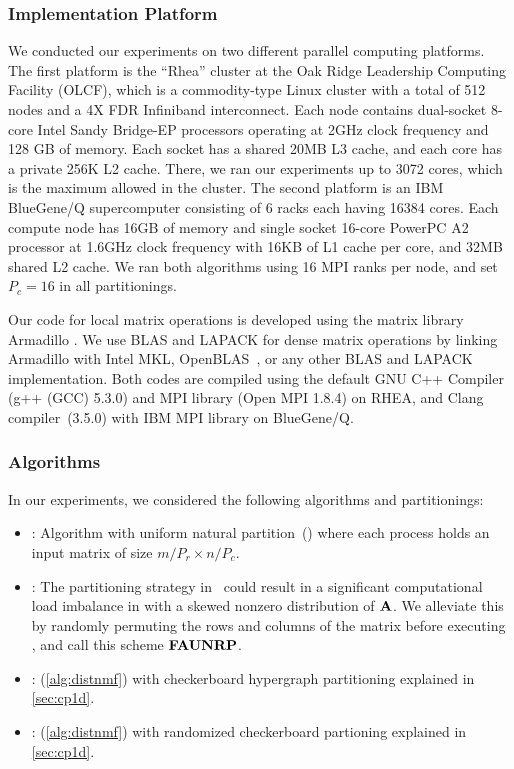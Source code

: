 \subsubsection{Implementation Platform}
We conducted our experiments on two different parallel computing platforms.
The first platform is the ``Rhea'' cluster at the Oak Ridge Leadership Computing Facility (OLCF), which is a commodity-type Linux cluster with a total of 512 nodes and a 4X FDR Infiniband interconnect.
Each node contains dual-socket 8-core Intel Sandy Bridge-EP processors operating at 2GHz clock frequency and 128 GB of memory.
Each socket has a shared 20MB L3 cache, and each core has a private 256K L2 cache. 
There, we ran our experiments up to 3072 cores, which is the maximum allowed in the cluster.
The second platform is an IBM BlueGene/Q supercomputer consisting of 6 racks each having 16384 cores.
Each compute node has 16GB of memory and single socket 16-core PowerPC A2 processor at 1.6GHz clock frequency with 16KB of L1 cache per core, and 32MB shared L2 cache.
We ran both algorithms using 16 MPI ranks per node, and set $P_c = 16$ in all partitionings.

Our code for local matrix operations is developed using the matrix library Armadillo \cite{sanderson2010}. 
We use BLAS and LAPACK for dense matrix operations by linking Armadillo with Intel MKL, OpenBLAS~\cite{xianyi2015}, or any other BLAS and LAPACK implementation.
Both codes are compiled using the default GNU C++ Compiler (g++ (GCC) 5.3.0) and MPI library (Open MPI 1.8.4) on RHEA, and Clang compiler~(3.5.0) with IBM MPI library on BlueGene/Q.

\subsubsection{Algorithms}

In our experiments, we considered the following algorithms and partitionings:
\begin{itemize}
	\item \unp: \mpifaun Algorithm \cite{KBP16,KBP16MPIFAUN} with uniform natural  partition~(\unp) where each process holds an input matrix of size $m/P_r \times n/P_c$. 
	\item \urp: The partitioning strategy in \unp\ could result in a significant computational load imbalance in with a skewed nonzero distribution of $\mathbf{A}$. We alleviate this by randomly permuting the rows and columns of the matrix before executing \mpifaun, and call this scheme $\textbf{FAUNRP}$.
	\item \cpp: \distspnmf (\cref{alg:distnmf}) with checkerboard hypergraph partitioning explained in \cref{sec:cp1d}.
	\item \crp: \distspnmf (\cref{alg:distnmf}) with randomized checkerboard partioning explained in \cref{sec:cp1d}.
	
\end{itemize}

